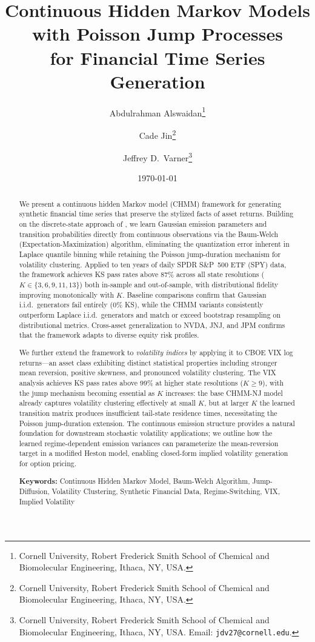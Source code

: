 \documentclass[11pt,a4paper]{article}
\title{Continuous Hidden Markov Models with Poisson Jump Processes\\for Financial Time Series Generation}
\author{
    Abdulrahman Alswaidan\thanks{Cornell University, Robert Frederick Smith School of Chemical and Biomolecular Engineering, Ithaca, NY, USA.}
    \and
    Cade Jin\thanks{Cornell University, Robert Frederick Smith School of Chemical and Biomolecular Engineering, Ithaca, NY, USA.}
    \and
    Jeffrey D.\ Varner\thanks{Cornell University, Robert Frederick Smith School of Chemical and Biomolecular Engineering, Ithaca, NY, USA. Email: \texttt{jdv27@cornell.edu}.}
}
\date{\today}
\begin{document}
\maketitle

\begin{abstract}
We present a continuous hidden Markov model (CHMM) framework for generating synthetic financial time series that preserve the stylized facts of asset returns.
Building on the discrete-state approach of \citet{alswaidan2026hybrid}, we learn Gaussian emission parameters and transition probabilities directly from continuous observations via the Baum-Welch (Expectation-Maximization) algorithm, eliminating the quantization error inherent in Laplace quantile binning while retaining the Poisson jump-duration mechanism for volatility clustering.
Applied to ten years of daily SPDR S\&P~500 ETF (SPY) data, the framework achieves KS pass rates above 87\% across all state resolutions ($K \in \{3, 6, 9, 11, 13\}$) both in-sample and out-of-sample, with distributional fidelity improving monotonically with $K$.
Baseline comparisons confirm that Gaussian i.i.d.\ generators fail entirely (0\% KS), while the CHMM variants consistently outperform Laplace i.i.d.\ generators and match or exceed bootstrap resampling on distributional metrics.
Cross-asset generalization to NVDA, JNJ, and JPM confirms that the framework adapts to diverse equity risk profiles.

We further extend the framework to \emph{volatility indices} by applying it to CBOE VIX log returns---an asset class exhibiting distinct statistical properties including stronger mean reversion, positive skewness, and pronounced volatility clustering.
The VIX analysis achieves KS pass rates above 99\% at higher state resolutions ($K \geq 9$), with the jump mechanism becoming essential as $K$ increases: the base CHMM-NJ model already captures volatility clustering effectively at small $K$, but at larger $K$ the learned transition matrix produces insufficient tail-state residence times, necessitating the Poisson jump-duration extension.
The continuous emission structure provides a natural foundation for downstream stochastic volatility applications; we outline how the learned regime-dependent emission variances can parameterize the mean-reversion target in a modified Heston model, enabling closed-form implied volatility generation for option pricing.

\bigskip\noindent
\textbf{Keywords:} Continuous Hidden Markov Model, Baum-Welch Algorithm, Jump-Diffusion, Volatility Clustering, Synthetic Financial Data, Regime-Switching, VIX, Implied Volatility
\end{abstract}
\end{document}
